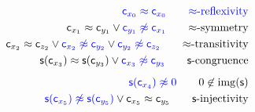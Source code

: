 	\begin{align*}
\colN \mc_{x_0} \mEQ \mc_{x_0}
\tag*{$\mEQ$-reflexivity}
\\
{\mc_{x_1} \mEQ \mc_{y_1}} \lor {\colN \mc_{y_1} \mNE \mc_{x_1}}
\tag*{$\mEQ$-symmetry}
\\
{\mc_{x_2} \mEQ \mc_{z_2}} \lor {\colN \mc_{x_2} \mNE \mc_{y_2}} \lor {\colN \mc_{y_2}\mNE \mc_{z_2}}
\tag*{$\mEQ$-transitivity}
\\
{ \msucc(\mc_{x_3}) \mEQ \msucc(\mc_{y_3})} \lor {\colN \mc_{x_3}\mNE \mc_{y_3}}
\tag*{$\msucc$-congruence}
\\[0.5em]
{\colN \msucc(\mc_{x_4})\mNE 0}
\tag*{$0\not\in\image(\msucc)$}
\\
{\colN \msucc(\mc_{x_5}) \mNE \msucc(\mc_{y_5})} \lor \mc_{x_5 }\mEQ \mc_{y_5}
\tag*{$\msucc$-injectivity}
\end{align*}



%



